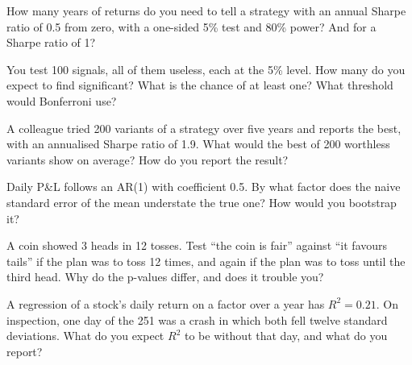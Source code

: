 \begin{interviewq}\label{iq:iv:statistics:8}
How many years of returns do you need to tell a strategy with an annual Sharpe ratio of 0.5 from zero, with a
one-sided 5\% test and 80\% power? And for a Sharpe ratio of 1?
\end{interviewq}

\begin{interviewq}\label{iq:iv:statistics:9}
You test 100 signals, all of them useless, each at the 5\% level. How many do you expect to find significant? What is
the chance of at least one? What threshold would Bonferroni use?
\end{interviewq}

\begin{interviewq}\label{iq:iv:statistics:10}
A colleague tried 200 variants of a strategy over five years and reports the best, with an annualised Sharpe ratio of
1.9. What would the best of 200 worthless variants show on average? How do you report the result?
\end{interviewq}

\begin{interviewq}\label{iq:iv:statistics:11}
Daily P\&L follows an AR(1) with coefficient 0.5. By what factor does the naive standard error of the mean understate
the true one? How would you bootstrap it?
\end{interviewq}

\begin{interviewq}\label{iq:iv:statistics:12}
A coin showed 3 heads in 12 tosses. Test ``the coin is fair'' against ``it favours tails'' if the plan was to toss 12
times, and again if the plan was to toss until the third head. Why do the p-values differ, and does it trouble you?
\end{interviewq}

\begin{interviewq}\label{iq:iv:statistics:13}
A regression of a stock's daily return on a factor over a year has $R^2 = 0.21$. On inspection, one day of the 251 was a
crash in which both fell twelve standard deviations. What do you expect $R^2$ to be without that day, and what do you
report?
\end{interviewq}

